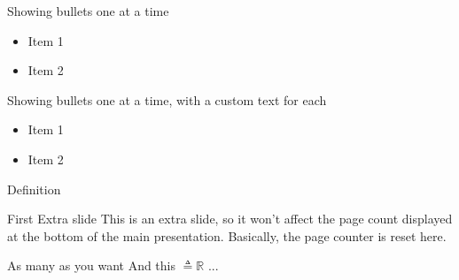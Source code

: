 \documentclass{beamer}
\begin{document}
\begin{frame}
    Showing bullets one at a time
    \begin{itemize}[<+->]
        \item Item 1
        \item Item 2
    \end{itemize}
\end{frame}




\begin{frame}
    Showing bullets one at a time, with a custom text for each
    \begin{itemize}[<+->]
        \item Item 1
        \item Item 2
    \end{itemize}

    \begin{block}{Definition}
    \end{block}

\end{frame}


\appendix  %

\begin{frame}[plain]{First Extra slide}
This is an extra slide, so it won't affect the page count displayed at the bottom of the main presentation. Basically, the page counter is reset here.
\end{frame}

\begin{frame}[plain]{As many as you want}
And this $\triangleq \mathbb{R}$ ...
\end{frame}
\end{document}
